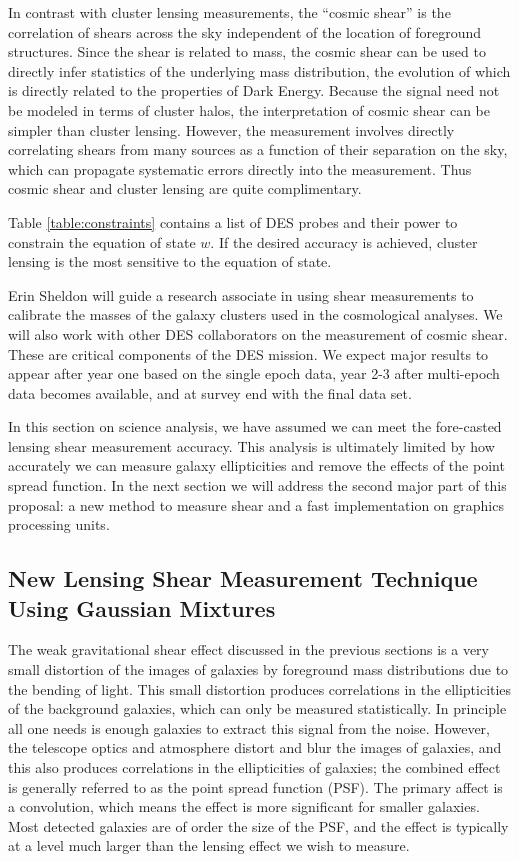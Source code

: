 \documentclass[12pt]{article}
\begin{document}
In contrast with cluster lensing measurements, the ``cosmic shear'' is the
correlation of shears across the sky independent of the location of foreground
structures.  Since the shear is related to mass, the cosmic shear can be used
to directly infer statistics of the underlying mass distribution, the evolution
of which is directly related to the properties of Dark Energy.  Because the
signal need not be modeled in terms of cluster halos, the interpretation of
cosmic shear can be simpler than cluster lensing.  However, the measurement
involves directly correlating shears from many sources as a function of their
separation on the sky, which can propagate systematic errors directly into the
measurement. Thus cosmic shear and cluster lensing are quite complimentary.

Table \ref{table:constraints} contains a list of DES probes and their power to
constrain the equation of state $w$.  If the desired accuracy is achieved,
cluster lensing is the most sensitive to the equation of state.

Erin Sheldon will guide a research associate in using shear measurements to
calibrate the masses of the galaxy clusters used in the cosmological analyses.
We will also work with other DES collaborators on the measurement of cosmic
shear.  These are critical components of the DES mission.  We expect major
results to appear after year one based on the single epoch data, year 2-3 after
multi-epoch data becomes available, and at survey end with the final data set.

In this section on science analysis, we have assumed we can meet the fore-casted
lensing shear measurement accuracy.  This analysis is ultimately limited by how
accurately we can measure galaxy ellipticities and remove the effects of the
point spread function.  In the next section we will address the second major
part of this proposal: a new method to measure shear and a fast implementation
on graphics processing units.

\subsection{New Lensing Shear Measurement Technique Using Gaussian Mixtures}
\label{sec:gmix}

The weak gravitational shear effect discussed in the previous sections is a
very small distortion of the images of galaxies by foreground mass
distributions due to the bending of light.  This small distortion produces
correlations in the ellipticities of the background galaxies, which can only be
measured statistically.  In principle all one needs is enough galaxies to
extract this signal from the noise.  However, the telescope optics and
atmosphere distort and blur the images of galaxies, and this also produces
correlations in the ellipticities of galaxies; the combined effect is generally
referred to as the point spread function (PSF). The primary affect is a
convolution, which means the effect is more significant for smaller galaxies.
Most detected galaxies are of order the size of the PSF, and the effect is
typically at a level much larger than the lensing effect we wish to measure.
\end{document}
